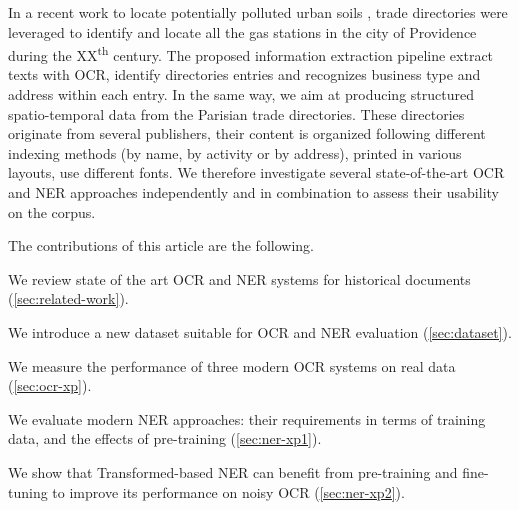 In a recent work to locate potentially polluted urban soils \cite{bell2020automated}, trade directories were leveraged to identify and locate all the gas stations in the city of Providence during the XX\textsuperscript{th} century.
The proposed information extraction pipeline extract texts with OCR, identify directories entries and recognizes business type and address within each entry.
In the same way, we aim at producing structured spatio-temporal data from the Parisian trade directories.
These directories originate from several publishers, their content is organized following different indexing methods (by name, by activity or by address), printed in various layouts, use different fonts.
We therefore investigate several state-of-the-art OCR and NER approaches independently and in combination to assess their usability on the corpus.

The contributions of this article are the following. 
\begin{enumerate*}[(i)]
    \item We review state of the art OCR and NER systems for historical documents (\cref{sec:related-work}).
    \item We introduce a new dataset suitable for OCR and NER evaluation (\cref{sec:dataset}).
    \item We measure the performance of three modern OCR systems on real data (\cref{sec:ocr-xp}).
    \item We evaluate modern NER approaches: their requirements in terms of training data, and the effects of pre-training (\cref{sec:ner-xp1}).
    \item We show that Transformed-based NER can benefit from pre-training and fine-tuning to improve its performance on noisy OCR (\cref{sec:ner-xp2}).
\end{enumerate*}



